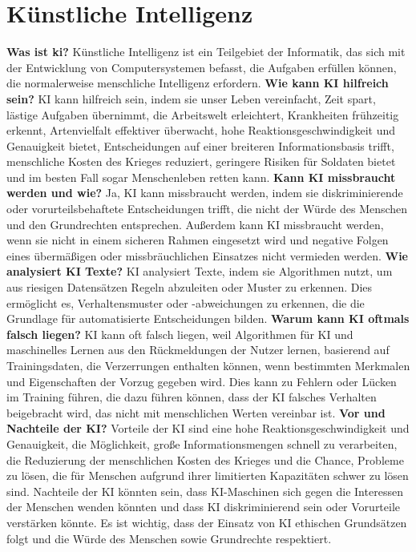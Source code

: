 \section{Künstliche Intelligenz}
\label{sec:ai}
\textbf{Was ist ki?} \newline
Künstliche Intelligenz ist ein Teilgebiet der Informatik, das sich mit der Entwicklung von Computersystemen befasst, die Aufgaben erfüllen können, die normalerweise menschliche Intelligenz erfordern. \newline
\textbf{Wie kann KI hilfreich sein?} \newline
KI kann hilfreich sein, indem sie unser Leben vereinfacht, Zeit spart, lästige Aufgaben übernimmt, die Arbeitswelt erleichtert, Krankheiten frühzeitig erkennt, Artenvielfalt effektiver überwacht, hohe Reaktionsgeschwindigkeit und Genauigkeit bietet, Entscheidungen auf einer breiteren Informationsbasis trifft, menschliche Kosten des Krieges reduziert, geringere Risiken für Soldaten bietet und im besten Fall sogar Menschenleben retten kann. \newline
\textbf{Kann KI missbraucht werden und wie?} \newline
Ja, KI kann missbraucht werden, indem sie diskriminierende oder vorurteilsbehaftete Entscheidungen trifft, die nicht der Würde des Menschen und den Grundrechten entsprechen. Außerdem kann KI missbraucht werden, wenn sie nicht in einem sicheren Rahmen eingesetzt wird und negative Folgen eines übermäßigen oder missbräuchlichen Einsatzes nicht vermieden werden. \newline
\textbf{Wie analysiert KI Texte?} \newline
KI analysiert Texte, indem sie Algorithmen nutzt, um aus riesigen Datensätzen Regeln abzuleiten oder Muster zu erkennen. Dies ermöglicht es, Verhaltensmuster oder -abweichungen zu erkennen, die die Grundlage für automatisierte Entscheidungen bilden.\newline
\textbf{Warum kann KI oftmals falsch liegen?} \newline
KI kann oft falsch liegen, weil Algorithmen für KI und maschinelles Lernen aus den Rückmeldungen der Nutzer lernen, basierend auf Trainingsdaten, die Verzerrungen enthalten können, wenn bestimmten Merkmalen und Eigenschaften der Vorzug gegeben wird. Dies kann zu Fehlern oder Lücken im Training führen, die dazu führen können, dass der KI falsches Verhalten beigebracht wird, das nicht mit menschlichen Werten vereinbar ist.\newline
\textbf{Vor und Nachteile der KI?} \newline
Vorteile der KI sind eine hohe Reaktionsgeschwindigkeit und Genauigkeit, die Möglichkeit, große Informationsmengen schnell zu verarbeiten, die Reduzierung der menschlichen Kosten des Krieges und die Chance, Probleme zu lösen, die für Menschen aufgrund ihrer limitierten Kapazitäten schwer zu lösen sind. Nachteile der KI könnten sein, dass KI-Maschinen sich gegen die Interessen der Menschen wenden könnten und dass KI diskriminierend sein oder Vorurteile verstärken könnte. Es ist wichtig, dass der Einsatz von KI ethischen Grundsätzen folgt und die Würde des Menschen sowie Grundrechte respektiert.